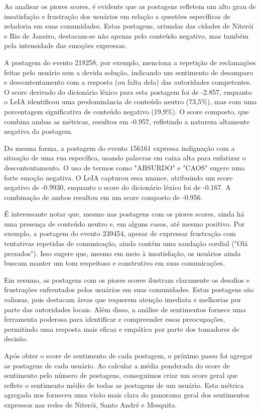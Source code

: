 Ao analisar os piores scores, é evidente que as postagens refletem um alto grau de insatisfação e frustração dos usuários em relação a questões específicas de zeladoria em suas comunidades. Estas postagens, oriundas das cidades de Niterói e Rio de Janeiro, destacam-se não apenas pelo conteúdo negativo, mas também pela intensidade das emoções expressas.

A postagem do evento 218258, por exemplo, menciona a repetição de reclamações feitas pelo usuário sem a devida solução, indicando um sentimento de desamparo e descontentamento com a resposta (ou falta dela) das autoridades competentes. O score derivado do dicionário léxico para esta postagem foi de -2.857, enquanto o LeIA identificou uma predominância de conteúdo neutro (73,5\%), mas com uma porcentagem significativa de conteúdo negativo (19,9\%). O score composto, que combina ambas as métricas, resultou em -0.957, refletindo a natureza altamente negativa da postagem.

Da mesma forma, a postagem do evento 156161 expressa indignação com a situação de uma rua específica, usando palavras em caixa alta para enfatizar o descontentamento. O uso de termos como "ABSURDO" e "CAOS" sugere uma forte emoção negativa. O LeIA capturou essa nuance, atribuindo um score negativo de -0.9930, enquanto o score do dicionário léxico foi de -0.167. A combinação de ambos resultou em um score composto de -0.956.

É interessante notar que, mesmo nas postagens com os piores scores, ainda há uma presença de conteúdo neutro e, em alguns casos, até mesmo positivo. Por exemplo, a postagem do evento 239454, apesar de expressar frustração com tentativas repetidas de comunicação, ainda contém uma saudação cordial ("Olá prezados"). Isso sugere que, mesmo em meio à insatisfação, os usuários ainda buscam manter um tom respeitoso e construtivo em suas comunicações.

Em resumo, as postagens com os piores scores ilustram claramente os desafios e frustrações enfrentados pelos usuários em suas comunidades. Estas postagens são valiosas, pois destacam áreas que requerem atenção imediata e melhorias por parte das autoridades locais. Além disso, a análise de sentimentos fornece uma ferramenta poderosa para identificar e compreender essas preocupações, permitindo uma resposta mais eficaz e empática por parte dos tomadores de decisão.

Após obter o score de sentimento de cada postagem, o próximo passo foi agregar as postagens de cada usuário. Ao calcular a média ponderada do score de sentimento pelo número de postagens, conseguimos criar um score geral que reflete o sentimento médio de todas as postagens de um usuário. Esta métrica agregada nos forneceu uma visão mais clara do panorama geral dos sentimentos expressos nas redes de Niterói, Santo André e Mesquita.


